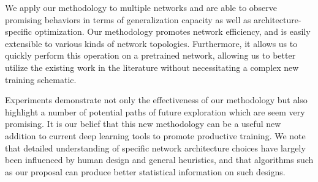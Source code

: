 \documentclass[10pt,twocolumn,letterpaper]{article}
\begin{document}
We apply our methodology to multiple networks and are able to observe promising behaviors in terms of generalization capacity as well as architecture-specific optimization.
Our methodology promotes network efficiency, and is easily extensible to various kinds of network topologies.
Furthermore, it allows us to quickly perform this operation on a pretrained network, allowing us to better utilize the existing work in the literature without necessitating a complex new training schematic.

Experiments demonstrate not only the effectiveness of our methodology but also highlight a number of potential paths of future exploration which are seem very promising.
It is our belief that this new methodology can be a useful new addition to current deep learning tools to promote productive training.
We note that detailed understanding of specific network architecture choices have largely been influenced by human design and general heuristics, and that algorithms such as our proposal can produce better statistical information on such designs.
{\small
  
  \nocite{*}
  
}
\end{document}
